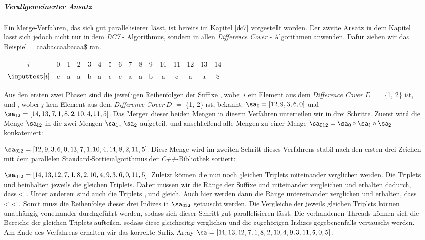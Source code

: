\subparagraph*{Verallgemeinerter Ansatz}

Ein Merge-Verfahren, das sich gut parallelisieren lässt, ist bereits im Kapitel \ref{dc7} vorgestellt worden. Der zweite Ansatz in dem Kapitel lässt sich jedoch nicht nur in dem \emph{DC7} - Algorithmus, sondern in allen \emph{Difference Cover} - Algorithmen anwenden.
Dafür ziehen wir das Beispiel  = caabaccaabacaa\$ ran.

\begin{table}[H]
	\centering
	\begin{tabular}{c| c c c c c c c c c c c c c c c}
		$i$ & 0 & 1 & 2 & 3 & 4 & 5 & 6 & 7 & 8 & 9 & 10 & 11 & 12 & 13 & 14 \\
		$\inputtext[i]$ & c & a & a & b & a & c & c & a & a & b & a & c & a & a & \$
	\end{tabular}
\end{table}

Aus den ersten zwei Phasen sind die jeweiligen Reihenfolgen der Suffixe , wobei $i$ ein Element aus dem \emph{Difference Cover} \(D\) $=$ \{1, 2\} ist, und , wobei $j$ kein Element aus dem \emph{Difference Cover} \(D\) $=$ \{1, 2\} ist, bekannt:
$\sa_{0} = [12, 9, 3, 6, 0]$ und $\sa_{12} = [14, 13, 7, 1, 8, 2, 10, 4, 11, 5]$.
Das Mergen dieser beiden Mengen in diesem Verfahren unterteilen wir in drei Schritte. Zuerst wird die Menge $\sa_{12}$ in die zwei Mengen $\sa_1$, $\sa_2$ aufgeteilt und anschließend alle Mengen zu einer Menge $\sa_{012} = \sa_0 \circ \sa_1 \circ \sa_2$ konkateniert:

$\sa_{012} = [12, 9, 3, 6, 0, 13, 7, 1, 10, 4, 14, 8, 2, 11, 5]$.
Diese Menge wird im zweiten Schritt dieses Verfahrens stabil nach den ersten drei Zeichen mit dem pa\-ral\-lel\-en Standard-Sortieralgorithmus der \emph{C++}-Bibliothek sortiert:

$\sa_{012} = [14, 13, 12, 7, 1, 8, 2, 10, 4, 9, 3, 6, 0, 11, 5]$. Zuletzt können die nun noch gleichen Triplets miteinander verglichen werden. Die Triplets  und  beinhalten jeweils die gleichen Triplets. Daher müssen wir die Ränge der Suffixe  und  miteinander vergleichen und erhalten dadurch, dass  < . Unter anderem sind auch die Triplets ,  und  gleich. Auch hier werden dann die Ränge untereinander verglichen und erhalten, dass  <  < . Somit muss die Reihenfolge dieser drei Indizes in $\sa_{012}$ getauscht werden. Die Vergleiche der jeweils gleichen Triplets können unabhängig voneinander durchgeführt werden, sodass sich dieser Schritt gut parallelisieren lässt. Die vorhandenen Threads können sich die Bereiche der gleichen Triplets aufteilen, sodass diese gleichzeitig verglichen und die zugehörigen Indizes gegebenenfalls vertauscht werden. Am Ende des Verfahrens erhalten wir das korrekte Suffix-Array $\sa = [14, 13, 12, 7, 1, 8, 2, 10, 4, 9, 3, 11, 6, 0, 5]$.